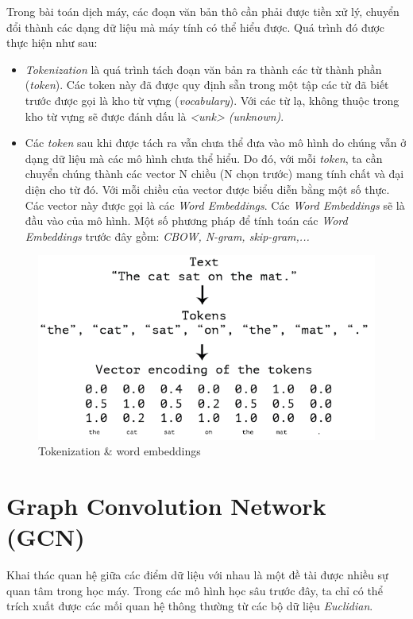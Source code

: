 Trong bài toán dịch máy, các đoạn văn bản thô cần phải được tiền xử lý, chuyển đổi thành các dạng dữ liệu mà máy tính có thể hiểu được. Quá trình đó được thực hiện như sau:
\begin{itemize}
	\item \textit{Tokenization} là quá trình tách đoạn văn bản ra thành các từ thành phần (\textit{token}). Các token này đã được quy định sẵn trong một tập các từ đã biết trước được gọi là kho từ vựng (\textit{vocabulary}). Với các từ lạ, không thuộc trong kho từ vựng sẽ được đánh dấu là \textit{<unk> (unknown)}.
	\item Các \textit{token} sau khi được tách ra vẫn chưa thể đưa vào mô hình do chúng vẫn ở dạng dữ liệu mà các mô hình chưa thể hiểu. Do đó, với mỗi \textit{token}, ta cần chuyển chúng thành các vector N chiều (N chọn trước) mang tính chất và đại diện cho từ đó. Với mỗi chiều của vector được biểu diễn bằng một số thực. Các vector này được gọi là các \textit{Word Embeddings}. Các \textit{Word Embeddings} sẽ là đầu vào của mô hình. Một số phương pháp để tính toán các \textit{Word Embeddings} trước đây gồm: \textit{CBOW, N-gram, skip-gram,...}
\end{itemize}

\begin{figure}[H]
    \begin{center}
        \includegraphics[scale=0.8]{images/token-embeddings}
        \caption{Tokenization \& word embeddings}
        \label{fig:token-embeddings}
    \end{center}
\end{figure}


\section{Graph Convolution Network (GCN)}
Khai thác quan hệ giữa các điểm dữ liệu với nhau là một đề tài được nhiều sự quan tâm trong học máy. Trong các mô hình học sâu trước đây, ta chỉ có thể trích xuất được các mối quan hệ thông thường từ các bộ dữ liệu \textit{Euclidian}.

